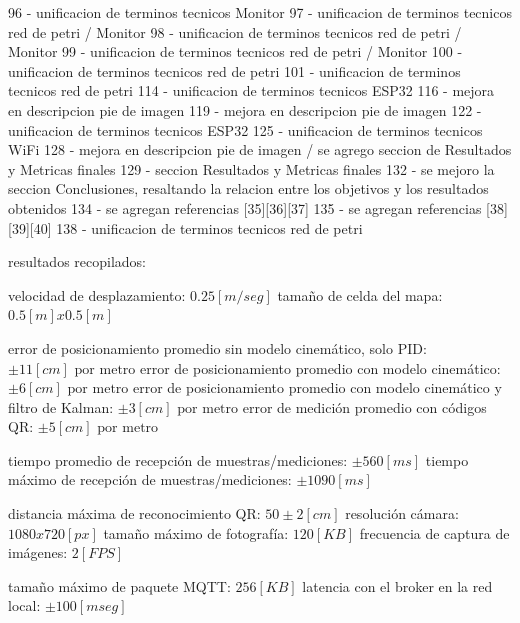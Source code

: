 96  - unificacion de terminos tecnicos Monitor
97  - unificacion de terminos tecnicos red de petri / Monitor
98  - unificacion de terminos tecnicos red de petri / Monitor
99  - unificacion de terminos tecnicos red de petri / Monitor
100 - unificacion de terminos tecnicos red de petri
101 - unificacion de terminos tecnicos red de petri
114 - unificacion de terminos tecnicos ESP32
116 - mejora en descripcion pie de imagen
119 - mejora en descripcion pie de imagen
122 - unificacion de terminos tecnicos ESP32
125 - unificacion de terminos tecnicos WiFi
128 - mejora en descripcion pie de imagen / se agrego seccion de Resultados y Metricas finales
129 - seccion Resultados y Metricas finales
132 - se mejoro la seccion Conclusiones, resaltando la relacion entre los objetivos y los resultados obtenidos
134 - se agregan referencias [35][36][37]
135 - se agregan referencias [38][39][40]
138 - unificacion de terminos tecnicos red de petri





resultados recopilados:

velocidad de desplazamiento: $0.25[m/seg]$
tamaño de celda del mapa: $0.5[m] x 0.5[m]$

error de posicionamiento promedio sin modelo cinemático, solo PID: $\pm11[cm]\text{ por metro}$
error de posicionamiento promedio con modelo cinemático: $\pm6[cm]\text{ por metro}$
error de posicionamiento promedio con modelo cinemático y filtro de Kalman: $\pm3[cm]\text{ por metro}$
error de medición promedio con códigos QR: $\pm5[cm]\text{ por metro}$

tiempo promedio de recepción de muestras/mediciones: $\pm560[ms]$
tiempo máximo de recepción de muestras/mediciones: $\pm1090[ms]$

distancia máxima de reconocimiento QR: $50 \pm 2 [cm]$
resolución cámara: $1080x720 [px]$
tamaño máximo de fotografía: $120 [KB]$
frecuencia de captura de imágenes: $2 [FPS]$

tamaño máximo de paquete MQTT: $256 [KB]$
latencia con el broker en la red local: $\pm 100 [mseg]$


